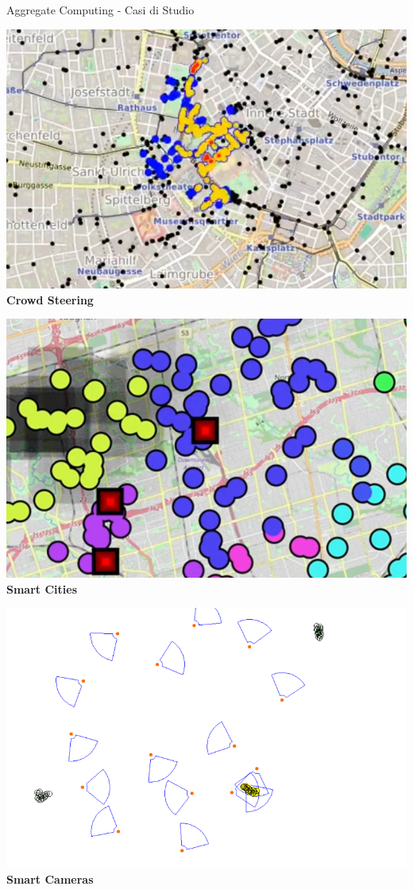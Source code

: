 \documentclass[presentation, 10pt,aspectratio=169]{beamer}\mode<presentation>{\usetheme{AMSBolognaFC}}
\begin{document}
\begin{frame}{Aggregate Computing - Casi di Studio}
	\begin{minipage}{0.32\textwidth}
		\href{https://youtu.be/606ObQwQuaE}{\includegraphics[width=\textwidth]{img/crowd-steering.png}}
		\centering
		\textbf{Crowd Steering}
	\end{minipage}
	\hfill
	\begin{minipage}{0.32\textwidth}
		\href{https://youtu.be/nWLaglM0EkY}{\includegraphics[width=\textwidth]{img/iot.png}}
		\centering
		\textbf{Smart Cities}
	\end{minipage}
	\begin{minipage}{0.32\textwidth}
		\href{https://youtu.be/yuaY_8Vr3oc}{\includegraphics[width=\textwidth]{img/smart-tracking.png}}
		\centering
		\textbf{Smart Cameras}
	\end{minipage}
\end{frame}
\end{document}
